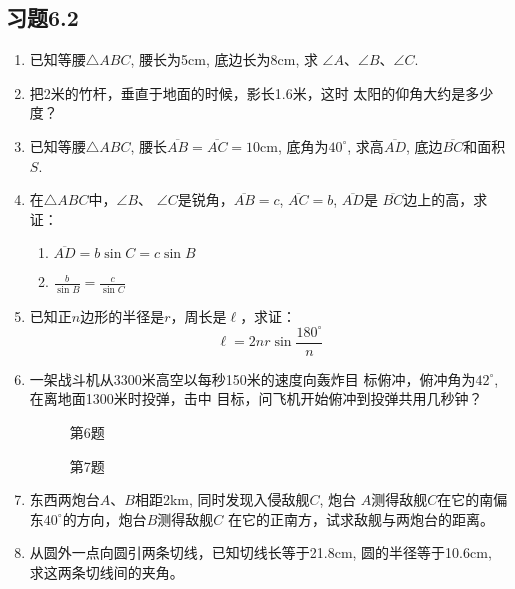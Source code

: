 \subsection*{习题6.2}
\begin{enumerate}
    \item 已知等腰$\triangle ABC$, 腰长为5cm, 底边长为8cm, 求
    $\angle A$、$\angle B$、$\angle C$.
    \item 把2米的竹杆，垂直于地面的时候，影长1.6米，这时
    太阳的仰角大约是多少度？
    \item  已知等腰$\triangle ABC$, 腰长$\overline{AB}=\overline{AC}=10$cm, 底角为$40^{\circ}$, 
    求高$\overline{AD}$, 底边$\overline{BC}$和面积$S$.
    \item 在$\triangle ABC$中，$\angle B$、
    $\angle C$是锐角，$\overline{AB}=c$, $\overline{AC}=b$, $\overline{AD}$是
    $\overline{BC}$边上的高，求证：
\begin{enumerate}
    \item $\overline{AD}=b\sin C=c\sin B$
    \item $\frac{b}{\sin B}=\frac{c}{\sin C}$
\end{enumerate}
\item 已知正$n$边形的半径是$r$，周长是$\ell$，求证：
\[\ell=2nr\sin\frac{180^{\circ}}{n}\]
\item  一架战斗机从3300米高空以每秒150米的速度向轰炸目
标俯冲，俯冲角为$42^{\circ}$, 在离地面1300米时投弹，击中
目标，问飞机开始俯冲到投弹共用几秒钟？
\begin{figure}[htp]\centering
    \begin{minipage}[t]{0.48\textwidth}
    \centering
{}
    \caption*{第6题}
    \end{minipage}
    \begin{minipage}[t]{0.48\textwidth}
    \centering
    \caption*{第7题}
    \end{minipage}
    \end{figure}

\item 东西两炮台$A$、$B$相距2km, 同时发现入侵敌舰$C$, 炮台
$A$测得敌舰$C$在它的南偏东$40^{\circ}$的方向，炮台$B$测得敌舰$C$
在它的正南方，试求敌舰与两炮台的距离。

\item 
从圆外一点向圆引两条切线，已知切线长等于21.8cm, 
圆的半径等于10.6cm, 求这两条切线间的夹角。
\end{enumerate}

